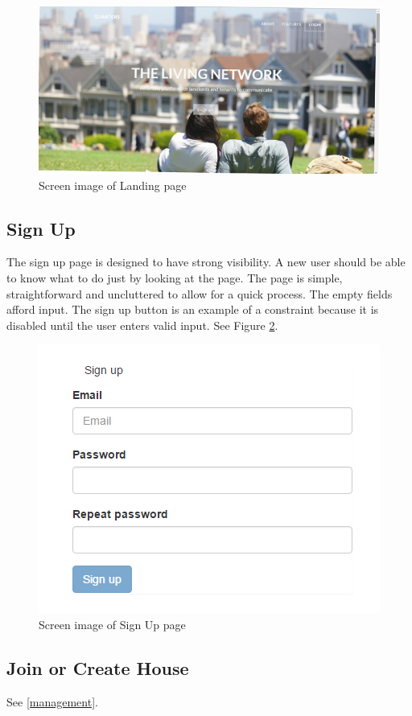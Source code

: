 \documentclass[12pt]{article}
\begin{document}
\begin{figure}[bp]
\centering
\includegraphics[width=\textwidth]{landing}
\caption{Screen image of Landing page}
\label{fig:landingPage}
\end{figure}

\subsection{Sign Up}
The sign up page is designed to have strong visibility. A new user should be able to know what to do just by looking at the page. The page is simple, straightforward and uncluttered to allow for a quick process. The empty fields afford input. The sign up button is an example of a constraint because it is disabled until the user enters valid input. See Figure \ref{fig:signup}.

\begin{figure}
\centering
\includegraphics{signup}
\caption{Screen image of Sign Up page}
\label{fig:signup}
\end{figure}

\subsection{Join or Create House}
See \ref{management}.
\end{document}
